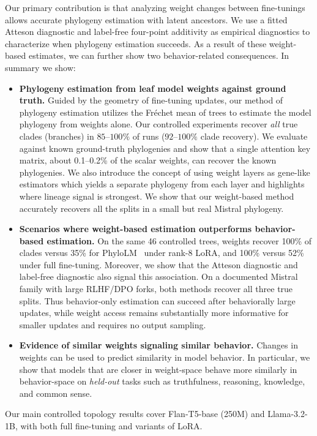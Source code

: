 \documentclass{article}
\theoremstyle{definition}
\theoremstyle{plain}
\begin{document}
Our primary contribution is that analyzing weight changes between fine-tunings allows accurate phylogeny estimation with latent ancestors. We use a fitted Atteson diagnostic and label-free four-point additivity as empirical diagnostics to characterize when phylogeny estimation succeeds. As a result of these weight-based estimates, we can further show two behavior-related consequences. In summary we show:
\begin{itemize}[leftmargin=1.3em,itemsep=1pt,topsep=2pt,parsep=0pt]
  \item \textbf{Phylogeny estimation from leaf model weights against ground truth.} Guided by the geometry of
    fine-tuning updates, our method of phylogeny estimation utilizes the  Fr\'echet mean of trees to estimate the model phylogeny from weights alone. Our controlled experiments recover \textit{all} true clades (branches) in $85$--$100\%$ of runs
    ($92$--$100\%$ clade recovery). We evaluate against known ground-truth phylogenies and show that a single attention key matrix, about 0.1--0.2\% of the scalar weights, can recover the known phylogenies. We also introduce the concept of using weight layers as gene-like estimators which yields a separate phylogeny from each layer and  highlights where lineage signal is strongest. We show that our weight-based method accurately recovers all the splits in a small but real Mistral phylogeny.
  \item \textbf{Scenarios where weight-based estimation outperforms behavior-based estimation.}
    On the same 46 controlled trees, weights recover 100\% of clades versus 35\% for
PhyloLM~\citep{yax2025phylolm} under rank-8 LoRA, and 100\% versus 52\% under full fine-tuning.  Moreover, we show that the Atteson diagnostic and label-free diagnostic also signal this association.
    On a documented Mistral family with large RLHF/DPO forks, both methods
    recover all three true splits. Thus behavior-only estimation can succeed after behaviorally large
    updates, while weight access remains substantially more informative for smaller updates and
    requires no output sampling.
  \item \textbf{Evidence of similar weights signaling similar behavior.} Changes in weights can be used to predict similarity in model behavior. In particular, we show that models that are closer in weight-space behave more similarly in behavior-space on \textit{held-out} tasks such as truthfulness, reasoning, knowledge, and common sense.
\end{itemize}
Our main controlled topology results cover Flan-T5-base (250M) and Llama-3.2-1B, with both full
fine-tuning and variants of LoRA. 
\end{document}
